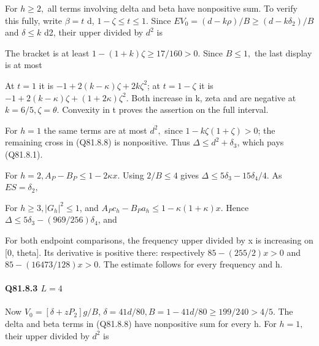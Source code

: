 For \(h\ge 2,\allowbreak \) all terms involving delta and beta have nonpositive sum.
To verify this fully, write \(\beta=t\) d, \(1-\zeta\le t\le 1.\) Since
\(EV_0=(d-k\rho)/B\ge(d-k\delta_2)/B\) and \(\delta\le k\) d2, their upper
divided by \(d^2\) is


The bracket is at least \(1-(1+k)\zeta\ge17/160>0\).
Since \(B\le 1,\allowbreak \) the last display is at most


At \(t=1\) it is \(-1+2(k-\kappa)\zeta+2k\zeta^2\);
at \(t=1-\zeta\) it is \(-1+2(k-\kappa)\zeta+(1+2\kappa)\zeta^2\).
Both increase in k, zeta and are negative at \(k=6/5,\allowbreak  \zeta=\theta.\)
Convexity in t proves the assertion on the full interval.

For \(h=1\) the same terms are at most \(d^2,\allowbreak \) since
\(1-k\zeta(1+\zeta)>0\); the remaining cross in (Q81.8.8) is
nonpositive. Thus \(\Delta\le d^2+\delta_3\), which pays (Q81.8.1).

For \(h=2,\allowbreak  A_P-B_P\le1-2\kappa x\). Using \(2/B\le 4\) gives
\(\Delta\le5\delta_3-15\delta_4/4\). As \(ES=\delta_2,\allowbreak \)


For \(h\ge 3,\allowbreak  |G_h|^2\le1\), and
\(A_Pc_h-B_Pa_h\le1-\kappa(1+\kappa)x\).
Hence \(\Delta\le5\delta_3-(969/256)\delta_4\), and


For both endpoint comparisons, the frequency upper divided by x is
increasing on [0, theta]. Its derivative is positive there:
respectively \(85-(255/2)x>0\) and
\(85-(16473/128)x>0\). The estimate follows for every frequency and h.

\paragraph{Q81.8.3 \(L=4\)}

Now \(V_0=[\delta+zP_2]g/B\), \(\delta=41d/80,\allowbreak  B=1-41d/80\ge199/240>4/5\).
The delta and beta terms in (Q81.8.8) have nonpositive sum for every h.
For \(h=1,\allowbreak \) their upper divided by \(d^2\) is


